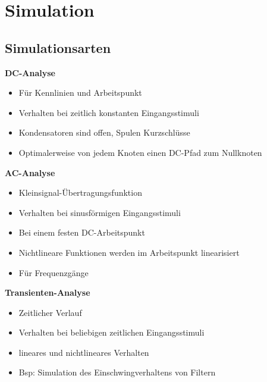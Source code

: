 \section{Simulation}
	\subsection{Simulationsarten}
		{\bf DC-Analyse}
		\begin{itemize}
			\item Für Kennlinien und Arbeitspunkt
			\item Verhalten bei zeitlich konstanten Eingangsstimuli
			\item Kondensatoren sind offen, Spulen Kurzschlüsse
			\item Optimalerweise von jedem Knoten einen DC-Pfad zum Nullknoten
		\end{itemize}
		{\bf AC-Analyse}
		\begin{itemize}
			\item Kleinsignal-Übertragungsfunktion
			\item Verhalten bei sinusförmigen Eingangsstimuli
			\item Bei einem festen DC-Arbeitspunkt
			\item Nichtlineare Funktionen werden im Arbeitspunkt linearisiert
			\item Für Frequenzgänge
		\end{itemize}
		{\bf Transienten-Analyse}
		\begin{itemize}
			\item Zeitlicher Verlauf
			\item Verhalten bei beliebigen zeitlichen Eingangsstimuli
			\item lineares und nichtlineares Verhalten
			\item Bsp: Simulation des Einschwingverhaltens von Filtern
		\end{itemize}

